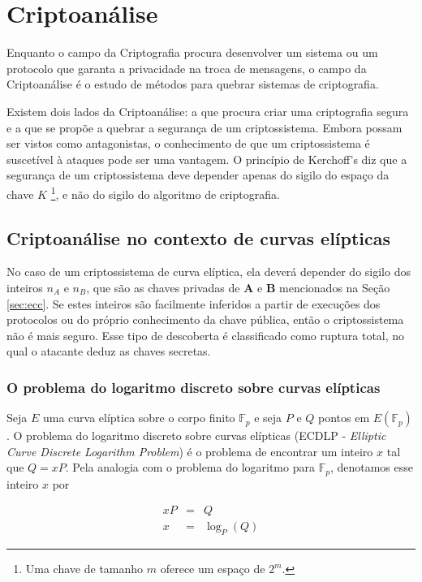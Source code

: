%
%
\chapter{Criptoanálise}
Enquanto o campo da Criptografia procura desenvolver um sistema ou um protocolo que garanta a privacidade na troca de mensagens, o campo da Criptoanálise é o estudo de métodos para quebrar sistemas de criptografia.

Existem dois lados da Criptoanálise: a que procura criar uma criptografia segura e a que se propõe a quebrar a segurança de um criptossistema. Embora possam ser vistos como antagonistas, o conhecimento de que um criptossistema é suscetível à ataques pode ser uma vantagem. O princípio de Kerchoff's diz que a segurança de um criptossistema deve depender apenas do sigilo do espaço da chave \(K\) \footnote{Uma chave de tamanho \(m\) oferece um espaço de \(2^m\).}, e não do sigilo do algoritmo de criptografia. \cite{Mandy:2007}

%
%
\section{Criptoanálise no contexto de curvas elípticas}
No caso de um criptossistema de curva elíptica, ela deverá depender do sigilo dos inteiros \(n_A\) e \(n_B\), que são as chaves privadas de \textbf{A} e \textbf{B} mencionados na Seção \ref{sec:ecc}. Se estes inteiros são facilmente inferidos a partir de execuções dos protocolos ou do próprio conhecimento da chave pública, então o criptossistema não é mais seguro. Esse tipo de descoberta é classificado como ruptura total, no qual o atacante deduz as chaves secretas. \cite{Knudsen:1998}

%
%
\subsection{O problema do logaritmo discreto sobre curvas elípticas} \label{ecdlp}
Seja \(E\) uma curva elíptica sobre o corpo finito $\mathbb{F}_p$ e seja \(P\) e \(Q\) pontos em $E(\mathbb{F}_p)$. O problema do logaritmo discreto sobre curvas elípticas (ECDLP - \textit{Elliptic Curve Discrete Logarithm Problem}) é o problema de encontrar um inteiro \(x\) tal que $Q = xP$. Pela analogia com o problema do logaritmo para $\mathbb{F}_p$, denotamos esse inteiro \(x\) por

\begin{eqnarray}
xP &=& Q \label{eq:ecdlp1} \\
x &=& \log_P(Q) \label{eq:ecdlp2}
\end{eqnarray}

